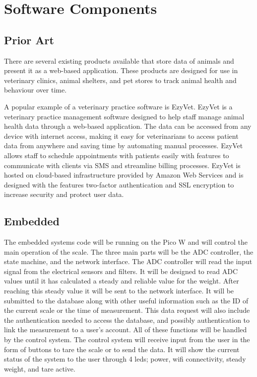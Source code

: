 
\chapter{Software Components}

\section{Prior Art}
There are several existing products available that store data of animals and present it as a web-based application. These products are designed for use in veterinary clinics, animal shelters, and pet stores to track animal health and behaviour over time. 

A popular example of a veterinary practice software is EzyVet. EzyVet is a veterinary practice management software designed to help staff manage animal health data through a web-based application. The data can be accessed from any device with internet access, making it easy for veterinarians to access patient data from anywhere and saving time by automating manual processes. EzyVet allows staff to schedule appointments with patients easily with features to communicate with clients via SMS and streamline billing processes. EzyVet is hosted on cloud-based infrastructure provided by Amazon Web Services and is designed with the features two-factor authentication and SSL encryption to increase security and protect user data.

\section{Embedded}
The embedded systems code will be running on the Pico W and will control the main operation of the scale. The three main parts will be the ADC controller, the state machine, and the network interface.
The ADC controller will read the input signal from the electrical sensors and filters. It will be designed to read ADC values until it has calculated a steady and reliable value for the weight.
After reaching this steady value it will be sent to the network interface. It will be submitted to the database along with other useful information such as the ID of the current scale or the time of measurement. This data request will also include the authentication needed to access the database, and possibly authentication to link the measurement to a user's account.
All of these functions will be handled by the control system. The control system will receive input from the user in the form of buttons to tare the scale or to send the data. It will show the current status of the system to the user through 4 leds; power, wifi connectivity, steady weight, and tare active.

